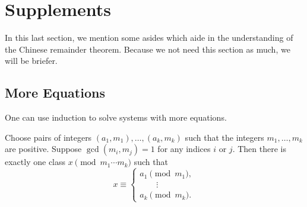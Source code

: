 \documentclass{article}
\begin{document}
\section{Supplements} \label{sec:supp}
In this last section, we mention some asides which aide in the understanding of the Chinese remainder theorem. Because we not need this section as much, we will be briefer.

\subsection{More Equations}
One can use induction to solve systems with more equations.
\begin{theorem}
	Choose pairs of integers $(a_1,m_1),\ldots,(a_k,m_k)$ such that the integers $m_1,\ldots,m_k$ are positive. Suppose $\gcd(m_i,m_j)=1$ for any indices $i$ or $j$. Then there is exactly one class $x\pmod{m_1\cdots m_k}$ such that
	\[x\equiv\begin{cases}
		a_1 \pmod{m_1}, \\
		\qquad\vdots \\
		a_k \pmod{m_k}.
	\end{cases}\]
\end{theorem}
\end{document}
